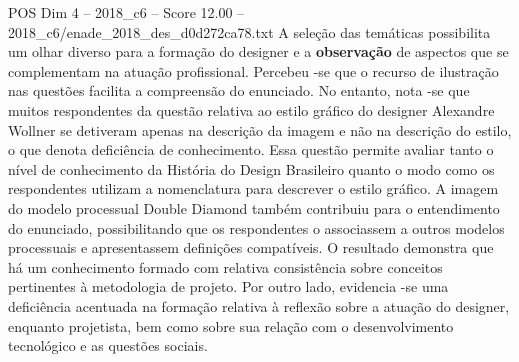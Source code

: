 \begin{textsample}{POS Dim 4 – 2018\_c6 – Score 12.00 – 2018\_c6/enade\_2018\_des\_d0d272ca78.txt}
A seleção das temáticas possibilita um olhar diverso para a formação do designer e a \textbf{observação} de aspectos que se complementam na atuação profissional.
Percebeu -se que o recurso de ilustração nas questões facilita a compreensão do enunciado.
No entanto, nota -se que muitos respondentes da questão relativa ao estilo gráfico do designer Alexandre Wollner se detiveram apenas na descrição da imagem e não na descrição do estilo, o que denota deficiência de conhecimento.
Essa questão permite avaliar tanto o nível de conhecimento da História do Design Brasileiro quanto o modo como os respondentes utilizam a nomenclatura para descrever o estilo gráfico.
A imagem do modelo processual Double Diamond também contribuiu para o entendimento do enunciado, possibilitando que os respondentes o associassem a outros modelos processuais e apresentassem definições compatíveis.
O resultado demonstra que há um conhecimento formado com relativa consistência sobre conceitos pertinentes à metodologia de projeto.
Por outro lado, evidencia -se uma deficiência acentuada na formação relativa à reflexão sobre a atuação do designer, enquanto projetista, bem como sobre sua relação com o desenvolvimento tecnológico e as questões sociais.

\end{textsample}
